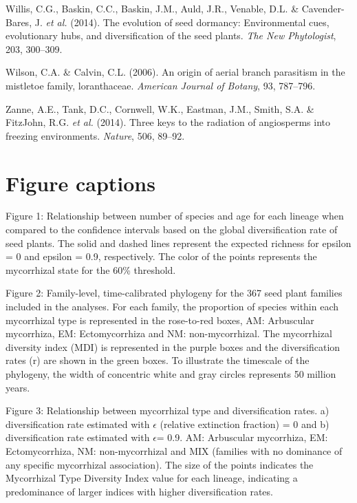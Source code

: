 \documentclass[12pt,]{article}
\begin{document}
\leavevmode\hypertarget{ref-willis_2014}{}%
Willis, C.G., Baskin, C.C., Baskin, J.M., Auld, J.R., Venable, D.L. \&
Cavender-Bares, J. \emph{et al.} (2014). The evolution of seed dormancy:
Environmental cues, evolutionary hubs, and diversification of the seed
plants. \emph{The New Phytologist}, 203, 300--309.

\leavevmode\hypertarget{ref-wilson_2006}{}%
Wilson, C.A. \& Calvin, C.L. (2006). An origin of aerial branch
parasitism in the mistletoe family, loranthaceae. \emph{American Journal
of Botany}, 93, 787--796.

\leavevmode\hypertarget{ref-zanne_2014}{}%
Zanne, A.E., Tank, D.C., Cornwell, W.K., Eastman, J.M., Smith, S.A. \&
FitzJohn, R.G. \emph{et al.} (2014). Three keys to the radiation of
angiosperms into freezing environments. \emph{Nature}, 506, 89--92.

\newpage

\hypertarget{figure-captions}{%
\section{Figure captions}\label{figure-captions}}

Figure 1: Relationship between number of species and age for each
lineage when compared to the confidence intervals based on the global
diversification rate of seed plants. The solid and dashed lines
represent the expected richness for epsilon = 0 and epsilon = 0.9,
respectively. The color of the points represents the mycorrhizal state
for the 60\% threshold.

Figure 2: Family-level, time-calibrated phylogeny for the 367 seed plant
families included in the analyses. For each family, the proportion of
species within each mycorrhizal type is represented in the rose-to-red
boxes, AM: Arbuscular mycorrhiza, EM: Ectomycorrhiza and NM:
non-mycorrhizal. The mycorrhizal diversity index (MDI) is represented in
the purple boxes and the diversification rates (r) are shown in the
green boxes. To illustrate the timescale of the phylogeny, the width of
concentric white and gray circles represents 50 million years.

Figure 3: Relationship between mycorrhizal type and diversification
rates. a) diversification rate estimated with \(\epsilon\) (relative
extinction fraction) = 0 and b) diversification rate estimated with
\(\epsilon\)= 0.9. AM: Arbuscular mycorrhiza, EM: Ectomycorrhiza, NM:
non-mycorrhizal and MIX (families with no dominance of any specific
mycorrhizal association). The size of the points indicates the
Mycorrhizal Type Diversity Index value for each lineage, indicating a
predominance of larger indices with higher diversification rates.
\end{document}
